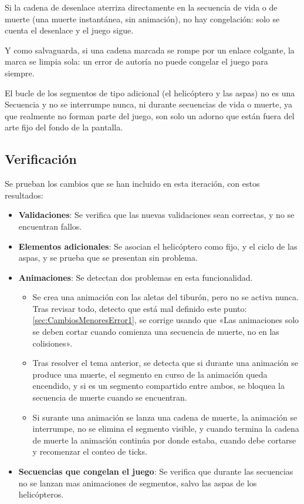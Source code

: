 Si la cadena de desenlace aterriza directamente en la secuencia de vida o de muerte (una muerte instantánea, sin animación), no hay congelación: solo se cuenta el desenlace y el juego sigue. 

Y como salvaguarda, si una cadena marcada se rompe por un enlace colgante, la marca se limpia sola: un error de autoría no puede congelar el juego para siempre.

El bucle de los segmentos de tipo adicional (el helicóptero y las aspas) no es una Secuencia y no se interrumpe nunca, ni durante secuencias de vida o muerte, ya que realmente no forman parte del juego, son solo un adorno que están fuera del arte fijo del fondo de la pantalla.

\subsection{Verificación}
\label{subsec:VerificacionF3I12}

Se prueban los cambios que se han incluido en esta iteración, con estos resultados:

\begin{itemize}
	\item \textbf{Validaciones}: Se verifica que las nuevas validaciones sean correctas, y no se encuentran fallos.
	
	\item \textbf{Elementos adicionales}: Se asocian el helicóptero como fijo, y el ciclo de las aspas, y se prueba que se presentan sin problema.
	
	\item \textbf{Animaciones}: Se detectan dos problemas en esta funcionalidad.
	\begin{itemize}
		\item Se crea una animación con las aletas del tiburón, pero no se activa nunca. Tras revisar todo, detecto que está mal definido este punto: \ref{sec:CambiosMenoresError1}, se corrige usando que «Las animaciones solo se deben cortar cuando comienza una secuencia de muerte, no en las colisiones».
		
		\item Tras resolver el tema anterior, se detecta que si durante una animación se produce una muerte, el segmento en curso de la animación queda encendido, y si es un segmento compartido entre ambos, se bloquea la secuencia de muerte cuando se encuentran.
		
		\item Si surante una animación se lanza una cadena de muerte, la animación se interrumpe, no se elimina el segmento visible, y cuando termina la cadena de muerte la animación continúa por donde estaba, cuando debe cortarse y recomenzar el conteo de ticks.
	\end{itemize}
	
	\item \textbf{Secuencias que congelan el juego}: Se verifica que durante las secuencias no se lanzan mas animaciones de segmentos, salvo las aspas de los helicópteros.
\end{itemize}

\clearpage